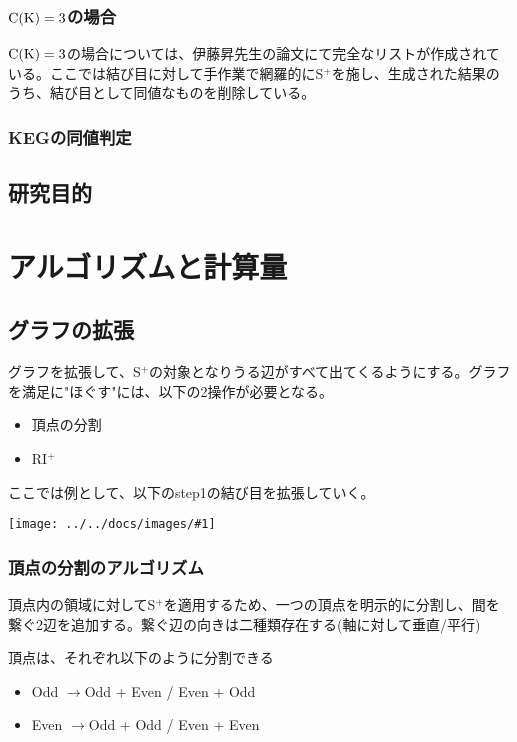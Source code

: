 \documentclass[11pt,a4j]{jarticle}
\newcommand{\splus}{S${}^\text{+}$}
\newcommand{\riplus}{RI${}^\text{+}$}
\newcommand{\f}[1]{$\rm{#1}$} %
\newcommand{\image}[1]{\begin{center}\texttt{[image: ../../docs/images/\#1]}\end{center}}
\newcommand{\ra }{$\rightarrow$}
\begin{document}
\subsubsection{\f{C(K)=3}の場合}
\f{C(K)=3}の場合については、伊藤昇先生の論文\cite{ck3}にて完全なリストが作成されている。ここでは結び目に対して手作業で網羅的に\splus を施し、生成された結果のうち、結び目として同値なものを削除している。

\subsubsection{KEGの同値判定}

\subsection{研究目的}

\section{アルゴリズムと計算量}

\subsection{グラフの拡張}
グラフを拡張して、\splus の対象となりうる辺がすべて出てくるようにする。グラフを満足に"ほぐす"には、以下の2操作が必要となる。
\begin{itemize}
    \item 頂点の分割
    \item \riplus
\end{itemize}

ここでは例として、以下のstep1の結び目を拡張していく。
\image{extend_default.jpg}

\subsubsection{頂点の分割のアルゴリズム}
頂点内の領域に対して\splus を適用するため、一つの頂点を明示的に分割し、間を繋ぐ2辺を追加する。繋ぐ辺の向きは二種類存在する(軸に対して垂直/平行)

頂点は、それぞれ以下のように分割できる
\begin{itemize}
    \item Odd \ra  Odd + Even / Even + Odd
    \item Even \ra  Odd + Odd / Even + Even
\end{itemize}
\end{document}
